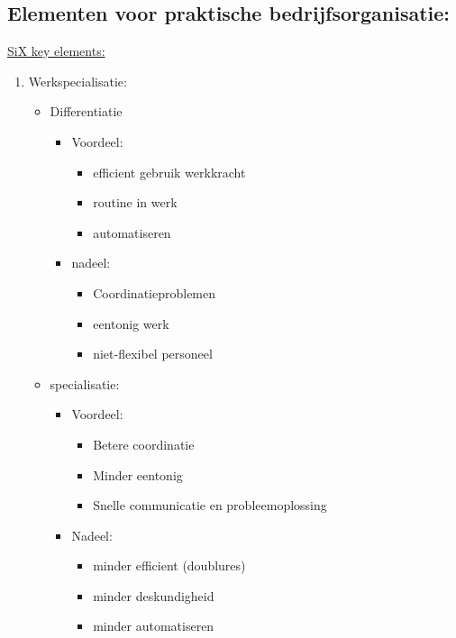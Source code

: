 \documentclass[12pt]{article}
\begin{document}
\subsection{Elementen voor praktische bedrijfsorganisatie:}
\underline{SiX key elements:}
\begin{enumerate}
    \item Werkspecialisatie:\begin{itemize}
        \item Differentiatie\begin{itemize}
            \item Voordeel:\begin{itemize}
                \item efficient gebruik werkkracht
                \item routine in werk
                \item automatiseren
            \end{itemize}
            \item nadeel:\begin{itemize}
                \item Coordinatieproblemen
                \item eentonig werk
                \item niet-flexibel personeel
            \end{itemize}
        \end{itemize}
        \item specialisatie:\begin{itemize}
            \item Voordeel:\begin{itemize}
                \item Betere coordinatie 
                \item Minder eentonig 
                \item Snelle communicatie en probleemoplossing
            \end{itemize}
            \item Nadeel:\begin{itemize}
                \item minder efficient (doublures)
                \item minder deskundigheid
                \item minder automatiseren
            \end{itemize}
        \end{itemize}
    \end{itemize}

\end{enumerate}
\end{document}
